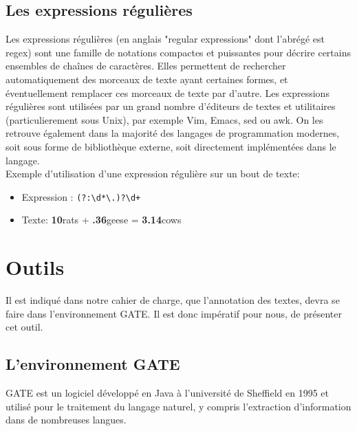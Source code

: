 \documentclass[a4paper, 11pt]{report}
\begin{document}
\subsection{Les expressions régulières}
Les expressions régulières (en anglais "regular expressions" dont l'abrégé est regex) sont une famille de notations compactes et puissantes pour décrire certains ensembles de chaînes de caractères. Elles permettent de rechercher automatiquement des morceaux de texte ayant certaines formes, et éventuellement remplacer ces morceaux de texte par d'autre.
Les expressions régulières sont utilisées par un grand nombre d'éditeurs de textes et utilitaires (particulierement sous Unix), par exemple Vim, Emacs, sed ou awk. On les retrouve également dans la majorité des langages de programmation modernes, soit sous forme de bibliothèque externe, soit directement implémentées dans le langage.\\
Exemple d'utilisation d'une expression régulière sur un bout de texte:
\begin{itemize}
\item Expression : \verb|(?:\d*\.)?\d+|
\item Texte: \textbf{10}rats + \textbf{.36}geese = \textbf{3.14}cows
\end{itemize}
\section{Outils}%
Il est indiqué dans notre cahier de charge, que l'annotation des textes, devra se faire dans l'environnement GATE. Il est donc impératif pour nous, de présenter cet outil.
\subsection{L'environnement GATE}
GATE est un logiciel développé en Java à l’université de Sheffield en 1995 et utilisé pour
le traitement du langage naturel, y compris l’extraction d’information dans de nombreuses
langues. 
\end{document}
